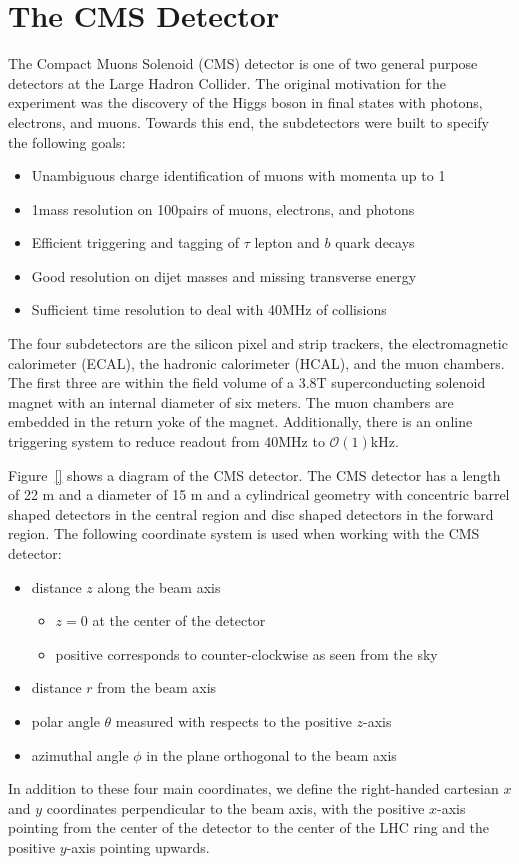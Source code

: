 \chapter{The CMS Detector}
\label{sec:cms}

The Compact Muons Solenoid (CMS) detector is one of two general purpose detectors at the Large Hadron Collider.
The original motivation for the experiment was the discovery of the Higgs boson in final states with photons, electrons, and muons.
Towards this end, the subdetectors were built to specify the following goals:
\begin{itemize}
\item Unambiguous charge identification of muons with momenta up to 1\TeV
\item 1\GeV mass resolution on 100\GeV pairs of muons, electrons, and photons
\item Efficient triggering and tagging of $\tau$ lepton and $b$ quark decays
\item Good resolution on dijet masses and missing transverse energy
\item Sufficient time resolution to deal with 40MHz of collisions
\end{itemize}
The four subdetectors are the silicon pixel and strip trackers, the electromagnetic calorimeter (ECAL), the hadronic calorimeter (HCAL), and the muon chambers.
The first three are within the field volume of a 3.8T superconducting solenoid magnet with an internal diameter of six meters.
The muon chambers are embedded in the return yoke of the magnet.
Additionally, there is an online triggering system to reduce readout from 40MHz to $\mathcal{O}(1)$kHz. 

Figure~\ref{} shows a diagram of the CMS detector.
The CMS detector has a length of 22 m and a diameter of 15 m and a cylindrical geometry with concentric barrel shaped detectors in the central region and disc shaped detectors in the forward region.
The following coordinate system is used when working with the CMS detector:
\begin{itemize}
\item distance $z$ along the beam axis
  \begin{itemize}
  \item $z=0$ at the center of the detector
  \item positive corresponds to counter-clockwise as seen from the sky
  \end{itemize}
\item distance $r$ from the beam axis
\item polar angle $\theta$ measured with respects to the positive $z$-axis
\item azimuthal angle $\phi$ in the plane orthogonal to the beam axis
\end{itemize}
In addition to these four main coordinates, we define the right-handed cartesian $x$ and $y$ coordinates perpendicular to the beam axis, with the positive $x$-axis pointing from the center of the detector to the center of the LHC ring and the positive $y$-axis pointing upwards.

